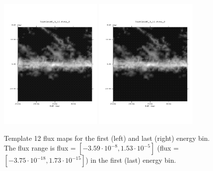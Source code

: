 \documentclass{article}
\begin{document}
\begin{figure}
\centering
\includegraphics[trim = 50 100 70 100, clip = true, width=0.45\textwidth]{figs/Template_maps/Template12_Ebin01}
\includegraphics[trim = 50 100 70 100, clip = true, width=0.45\textwidth]{figs/Template_maps/Template12_Ebin71}
\caption{Template 12 flux maps for the first (left) and last (right) energy bin. The flux range is flux = $[-3.59 \cdot 10^{-8}, 1.53 \cdot 10^{-5}]$ (flux = $[-3.75 \cdot 10^{-18}, 1.73 \cdot 10^{-15}]$) in the first (last) energy bin.}
\end{figure}
\end{document}
